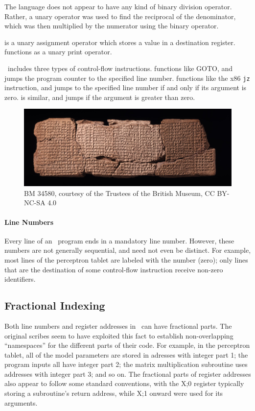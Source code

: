 \documentclass[11pt]{article}
\newcommand{\emeszida}{\textcuneiform{𒅴𒋃𒀀}}
\begin{document}
The language does not appear to have any kind of binary division operator. Rather, a unary  operator was used to find the reciprocal of the denominator, which was then multiplied by the numerator using the binary  operator.

 is a unary assignment operator which stores a value in a destination register.  functions as a unary print operator.

\emeszida\ includes three types of control-flow instructions.  functions like GOTO, and jumps the program counter to the specified line number.  functions like the x86 \texttt{jz} instruction, and jumps to the specified line number if and only if its argument is zero.  is similar, and jumps if the argument is greater than zero.

\begin{figure}
    \centering
    \includegraphics[width=\textwidth]{BM_34580.jpg}
    \caption{BM 34580, courtesy of the Trustees of the British Museum, CC BY-NC-SA 4.0}
    \label{fig:BM_34580}
  \end{figure}

\paragraph{Line Numbers}
Every line of an \emeszida\ program ends in a mandatory line number. 
However, these numbers are not generally sequential, and need not even be distinct. 
For example, most lines of the perceptron tablet are labeled with the number  (zero); only lines that are the destination of some control-flow instruction receive non-zero identifiers. 

\subsection{Fractional Indexing}
Both line numbers and register addresses in \emeszida\ can have fractional parts.
The original scribes seem to have exploited this fact to establish non-overlapping ``namespaces'' for the different parts of their code. 
For example, in the perceptron tablet, all of the model parameters are stored in adresses with integer part 1; the program inputs all have integer part 2; the matrix multiplication subroutine uses addresses with integer part 3; and so on.
The fractional parts of register addresses also appear to follow some standard conventions, with the X;0 register typically storing a subroutine's return address, while X;1 onward were used for its arguments.
\end{document}
